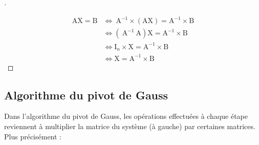 \documentclass[12pt]{article}
\theoremstyle{break}
\newenvironment{demo}[1][\proofname]{%
  \begin{proof}[#1]$ $\newline
}{%
  \end{proof}
}
\begin{document}
\begin{demo}

$$
\begin{aligned}
\mathrm{AX}=\mathrm{B} & \Longleftrightarrow \mathrm{~A}^{-1} \times(\mathrm{AX})=\mathrm{A}^{-1} \times \mathrm{B} \\
& \Longleftrightarrow\left(\mathrm{~A}^{-1} \mathrm{~A}\right) \mathrm{X}=\mathrm{A}^{-1} \times \mathrm{B} \\
& \Longleftrightarrow \mathrm{I}_{n} \times \mathrm{X}=\mathrm{A}^{-1} \times \mathrm{B} \\
& \Longleftrightarrow \mathrm{X}=\mathrm{A}^{-1} \times \mathrm{B}
\end{aligned}
$$
\end{demo}

\subsection{Algorithme du pivot de Gauss}
Dans l'algorithme du pivot de Gauss, les opérations effectuées à chaque étape reviennent à multiplier la matrice du système (à gauche) par certaines matrices. Plus précisément :
\end{document}
